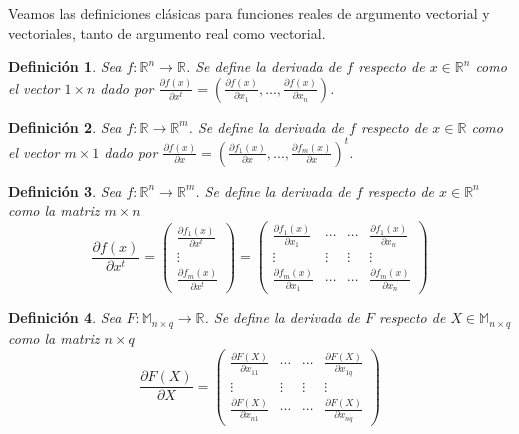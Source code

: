 \documentclass{article}
\theoremstyle{theorem-style}  %
\theoremstyle{definition-style}
\newtheorem{definition}{Definición}[section]
\theoremstyle{example-style}
\theoremstyle{exercise-style}
\begin{document}
	Veamos las definiciones clásicas para funciones reales de argumento vectorial y vectoriales, tanto de argumento real como vectorial.
	
	\begin{definition}
		Sea $f:\mathbb{R}^n\rightarrow \mathbb{R}$. Se define la derivada de $f$ respecto de $x\in \mathbb{R}^n$ como el vector $1\times n$ dado por $\displaystyle \frac{\partial f(x)}{\partial x^t} = \displaystyle \left( \frac{\partial f(x)}{\partial x_1},..., \frac{\partial f(x)}{\partial x_n} \right)$.
	\end{definition}
	
	\begin{definition}
		Sea $f:\mathbb{R}\rightarrow \mathbb{R}^m$. Se define la derivada de $f$ respecto de $x\in \mathbb{R}$ como el vector $m\times 1$ dado por $\displaystyle \frac{\partial f(x)}{\partial x} = \displaystyle \left( \frac{\partial f_1(x)}{\partial x},..., \frac{\partial f_m(x)}{\partial x} \right)^t$.
	\end{definition}
	
	\begin{definition}
		Sea $f:\mathbb{R}^n\rightarrow \mathbb{R}^m$. Se define la derivada de $f$ respecto de $x\in \mathbb{R}^n$ como la matriz $m\times n$
		$$ \frac{\partial f(x)}{\partial x^t} = \left( \begin{array}{c}
		\frac{\partial f_1(x)}{\partial x^t} \\ \vdots \\ \frac{\partial f_m(x)}{\partial x^t}
		\end{array}\right) =
		\left( \begin{array}{cccc}
		\frac{\partial f_1(x)}{\partial x_1} & \cdots & \cdots & \frac{\partial f_1(x)}{\partial x_n}\\
		\vdots & \vdots & \vdots & \vdots \\
		\frac{\partial f_m(x)}{\partial x_1} & \cdots & \cdots & \frac{\partial f_m(x)}{\partial x_n}
		\end{array}\right)$$
	\end{definition}
	
	\begin{definition}
		Sea $F:\mathbb{M}_{n\times q}\rightarrow \mathbb{R}$. Se define la derivada de $F$ respecto de $X\in \mathbb{M}_{n\times q}$ como la matriz $n\times q$
		$$ \frac{\partial F(X)}{\partial X} = \left( \begin{array}{cccc}
		\frac{\partial F(X)}{\partial x_{11}} & \cdots & \cdots & \frac{\partial F(X)}{\partial x_{1q}}\\
		\vdots & \vdots & \vdots & \vdots \\
		\frac{\partial F(X)}{\partial x_{n1}} & \cdots & \cdots & \frac{\partial F(X)}{\partial x_{nq}}
		\end{array}\right)$$
	\end{definition}
	
\end{document}
